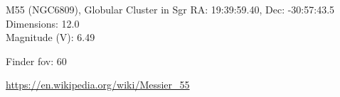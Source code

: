\begin{block}{M55 (NGC6809), Globular Cluster in Sgr}
    RA: 19:39:59.40, Dec: -30:57:43.5 \\ 
    Dimensions: 12.0 \\ 
    Magnitude (V): 6.49



    Finder fov: 60 

    \url{https://en.wikipedia.org/wiki/Messier_55} 
\end{block}